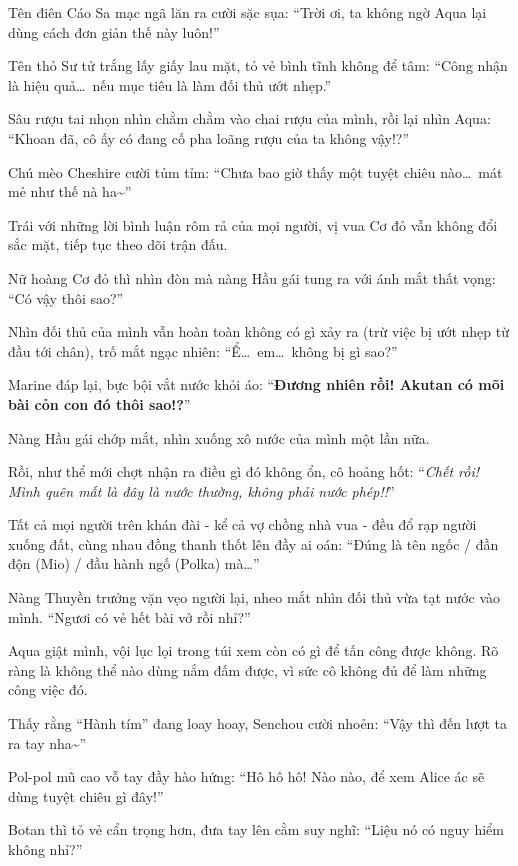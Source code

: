 \documentclass[../main.tex]{subfiles}
\begin{document}
Tên điên Cáo Sa mạc ngã lăn ra cười sặc sụa: ``Trời ơi, ta không ngờ Aqua lại dùng cách đơn giản thế này luôn!''

Tên thỏ Sư tử trắng lấy giấy lau mặt, tỏ vẻ bình tĩnh không để tâm: ``Công nhận là hiệu quả\dots\ nếu mục tiêu là làm đối thủ ướt nhẹp.''

Sâu rượu tai nhọn nhìn chằm chằm vào chai rượu của mình, rồi lại nhìn Aqua: ``Khoan đã, cô ấy có đang cố pha loãng rượu của ta không vậy!?''

Chú mèo Cheshire cười tủm tỉm: ``Chưa bao giờ thấy một tuyệt chiêu nào\dots\ mát mẻ như thế nà ha\~{}''

Trái với những lời bình luận rôm rả của mọi người, vị vua Cơ đỏ vẫn không đổi sắc mặt, tiếp tục theo dõi trận đấu.

Nữ hoàng Cơ đỏ thì nhìn đòn mà nàng Hầu gái tung ra với ánh mắt thất vọng: ``Có vậy thôi sao?''

Nhìn đối thủ của mình vẫn hoàn toàn không có gì xảy ra (trừ việc bị ướt nhẹp từ đầu tới chân),  trố mắt ngạc nhiên: ``Ể\dots\ em\dots\ không bị gì sao?''

Marine đáp lại, bực bội vắt nước khỏi áo: ``\textbf{Đương nhiên rồi! Akutan có mõi bài cỏn con đó thôi sao!?}''

Nàng Hầu gái chớp mắt, nhìn xuống xô nước của mình một lần nữa.

Rồi, như thể mới chợt nhận ra điều gì đó không ổn, cô hoảng hốt: ``\textit{Chết rồi! Mình quên mất là đây là nước thường, không phải nước phép!!}''

Tất cả mọi người trên khán đài - kể cả vợ chồng nhà vua - đều đổ rạp người xuống đất, cùng nhau đồng thanh thốt lên đầy ai oán: ``Đúng là tên ngốc / đần độn (Mio) / đầu hành ngố (Polka) mà\dots''

Nàng Thuyền trưởng vặn vẹo người lại, nheo mắt nhìn đối thủ vừa tạt nước vào mình. ``Ngươi có vẻ hết bài vở rồi nhỉ?''

Aqua giật mình, vội lục lọi trong túi xem còn có gì để tấn công được không. Rõ ràng là không thể nào dùng nắm đấm được, vì sức cô không đủ để làm những công việc đó.

Thấy rằng ``Hành tím'' đang loay hoay, Senchou cười nhoẻn: ``Vậy thì đến lượt ta ra tay nha\~{}''

Pol-pol mũ cao vỗ tay đầy hào hứng: ``Hô hô hô! Nào nào, để xem Alice ác sẽ dùng tuyệt chiêu gì đây!''

Botan thì tỏ vẻ cẩn trọng hơn, đưa tay lên cằm suy nghĩ: ``Liệu nó có nguy hiểm không nhỉ?''
\end{document}
